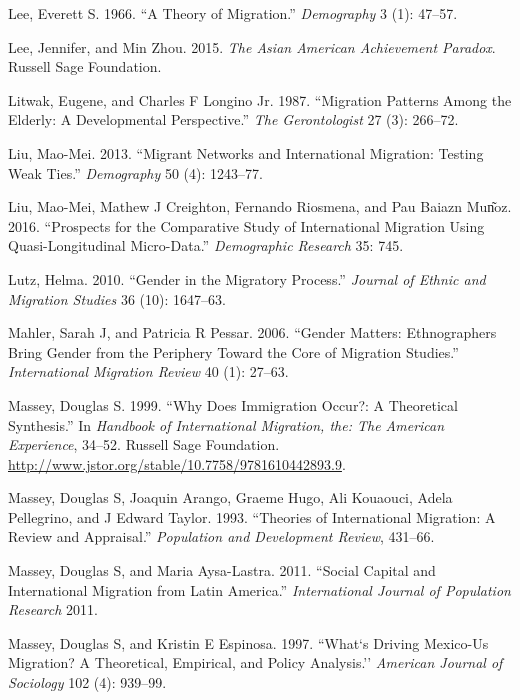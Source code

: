 \documentclass[
]{article}
\begin{document}
\leavevmode\hypertarget{ref-lee1966theory}{}%
Lee, Everett S. 1966. ``A Theory of Migration.'' \emph{Demography} 3
(1): 47--57.

\leavevmode\hypertarget{ref-lee2015asian}{}%
Lee, Jennifer, and Min Zhou. 2015. \emph{The Asian American Achievement
Paradox}. Russell Sage Foundation.

\leavevmode\hypertarget{ref-litwak1987migration}{}%
Litwak, Eugene, and Charles F Longino Jr. 1987. ``Migration Patterns
Among the Elderly: A Developmental Perspective.'' \emph{The
Gerontologist} 27 (3): 266--72.

\leavevmode\hypertarget{ref-liu2013migrant}{}%
Liu, Mao-Mei. 2013. ``Migrant Networks and International Migration:
Testing Weak Ties.'' \emph{Demography} 50 (4): 1243--77.

\leavevmode\hypertarget{ref-liu2016prospects}{}%
Liu, Mao-Mei, Mathew J Creighton, Fernando Riosmena, and Pau Baiazn
Mun͂oz. 2016. ``Prospects for the Comparative Study of International
Migration Using Quasi-Longitudinal Micro-Data.'' \emph{Demographic
Research} 35: 745.

\leavevmode\hypertarget{ref-lutz2010gender}{}%
Lutz, Helma. 2010. ``Gender in the Migratory Process.'' \emph{Journal of
Ethnic and Migration Studies} 36 (10): 1647--63.

\leavevmode\hypertarget{ref-mahler2006gender}{}%
Mahler, Sarah J, and Patricia R Pessar. 2006. ``Gender Matters:
Ethnographers Bring Gender from the Periphery Toward the Core of
Migration Studies.'' \emph{International Migration Review} 40 (1):
27--63.

\leavevmode\hypertarget{ref-massey1999why}{}%
Massey, Douglas S. 1999. ``Why Does Immigration Occur?: A Theoretical
Synthesis.'' In \emph{Handbook of International Migration, the: The
American Experience}, 34--52. Russell Sage Foundation.
\url{http://www.jstor.org/stable/10.7758/9781610442893.9}.

\leavevmode\hypertarget{ref-massey1993theories}{}%
Massey, Douglas S, Joaquin Arango, Graeme Hugo, Ali Kouaouci, Adela
Pellegrino, and J Edward Taylor. 1993. ``Theories of International
Migration: A Review and Appraisal.'' \emph{Population and Development
Review}, 431--66.

\leavevmode\hypertarget{ref-massey2011social}{}%
Massey, Douglas S, and Maria Aysa-Lastra. 2011. ``Social Capital and
International Migration from Latin America.'' \emph{International
Journal of Population Research} 2011.

\leavevmode\hypertarget{ref-massey1997s}{}%
Massey, Douglas S, and Kristin E Espinosa. 1997. ``What`s Driving
Mexico-Us Migration? A Theoretical, Empirical, and Policy Analysis.''
\emph{American Journal of Sociology} 102 (4): 939--99.
\end{document}
